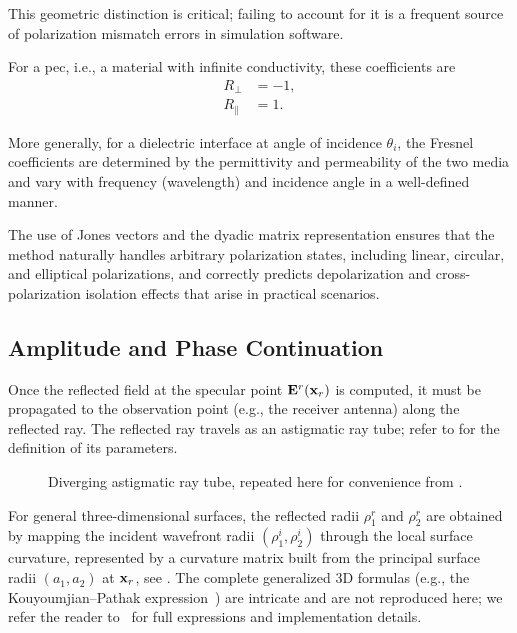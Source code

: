 This geometric distinction is critical; failing to account for it is a frequent source of polarization mismatch errors in simulation software.

For a \gls{pec}, i.e., a material with infinite conductivity, these coefficients are
\begin{align}
  R_{\perp} &= -1, \\
  R_{\parallel} &= 1.
\end{align}

More generally, for a dielectric interface at angle of incidence $\theta_i$, the Fresnel coefficients are determined by the permittivity and permeability of the two media and vary with frequency (\gls{wavelength}) and incidence angle in a well-defined manner.

The use of Jones vectors and the dyadic matrix representation ensures that the method naturally handles arbitrary polarization states, including linear, circular, and elliptical polarizations, and correctly predicts depolarization and cross-polarization isolation effects that arise in practical scenarios.

\subsection{Amplitude and Phase Continuation}

Once the reflected field at the specular point $\mathbf{E}^r(\mathbf{x}_r)$ is computed, it must be propagated to the observation point (e.g., the receiver antenna) along the reflected ray. The reflected ray travels as an astigmatic ray tube; refer to  for the definition of its parameters.

\begin{figure}
  \centering
  \caption{Diverging astigmatic ray tube, repeated here for convenience from .}
\end{figure}

For general three-dimensional surfaces, the reflected radii $\rho_1^r$ and $\rho_2^r$ are obtained by mapping the incident wavefront radii $(\rho_1^i,\rho_2^i)$ through the local surface curvature, represented by a curvature matrix built from the principal surface radii $(a_1,a_2)$ at $\mathbf{x}_r$, see . The complete generalized 3D formulas (e.g., the Kouyoumjian--Pathak expression~) are intricate and are not reproduced here; we refer the reader to~ for full expressions and implementation details.

